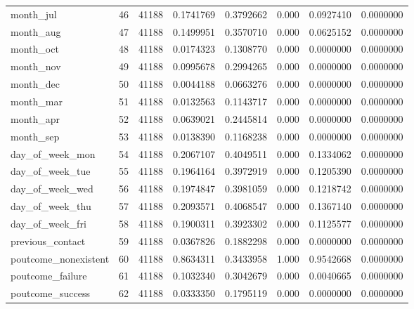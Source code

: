 \documentclass[english,man]{apa6}
\begin{document}
\begin{longtable}[c]{@{}lrrrrrrr@{}}
month\_jul & 46 & 41188 & 0.1741769 & 0.3792662 & 0.000 & 0.0927410 &
0.0000000\tabularnewline
month\_aug & 47 & 41188 & 0.1499951 & 0.3570710 & 0.000 & 0.0625152 &
0.0000000\tabularnewline
month\_oct & 48 & 41188 & 0.0174323 & 0.1308770 & 0.000 & 0.0000000 &
0.0000000\tabularnewline
month\_nov & 49 & 41188 & 0.0995678 & 0.2994265 & 0.000 & 0.0000000 &
0.0000000\tabularnewline
month\_dec & 50 & 41188 & 0.0044188 & 0.0663276 & 0.000 & 0.0000000 &
0.0000000\tabularnewline
month\_mar & 51 & 41188 & 0.0132563 & 0.1143717 & 0.000 & 0.0000000 &
0.0000000\tabularnewline
month\_apr & 52 & 41188 & 0.0639021 & 0.2445814 & 0.000 & 0.0000000 &
0.0000000\tabularnewline
month\_sep & 53 & 41188 & 0.0138390 & 0.1168238 & 0.000 & 0.0000000 &
0.0000000\tabularnewline
day\_of\_week\_mon & 54 & 41188 & 0.2067107 & 0.4049511 & 0.000 &
0.1334062 & 0.0000000\tabularnewline
day\_of\_week\_tue & 55 & 41188 & 0.1964164 & 0.3972919 & 0.000 &
0.1205390 & 0.0000000\tabularnewline
day\_of\_week\_wed & 56 & 41188 & 0.1974847 & 0.3981059 & 0.000 &
0.1218742 & 0.0000000\tabularnewline
day\_of\_week\_thu & 57 & 41188 & 0.2093571 & 0.4068547 & 0.000 &
0.1367140 & 0.0000000\tabularnewline
day\_of\_week\_fri & 58 & 41188 & 0.1900311 & 0.3923302 & 0.000 &
0.1125577 & 0.0000000\tabularnewline
previous\_contact & 59 & 41188 & 0.0367826 & 0.1882298 & 0.000 &
0.0000000 & 0.0000000\tabularnewline
poutcome\_nonexistent & 60 & 41188 & 0.8634311 & 0.3433958 & 1.000 &
0.9542668 & 0.0000000\tabularnewline
poutcome\_failure & 61 & 41188 & 0.1032340 & 0.3042679 & 0.000 &
0.0040665 & 0.0000000\tabularnewline
poutcome\_success & 62 & 41188 & 0.0333350 & 0.1795119 & 0.000 &
0.0000000 & 0.0000000\tabularnewline
\bottomrule
\end{longtable}
\end{document}
